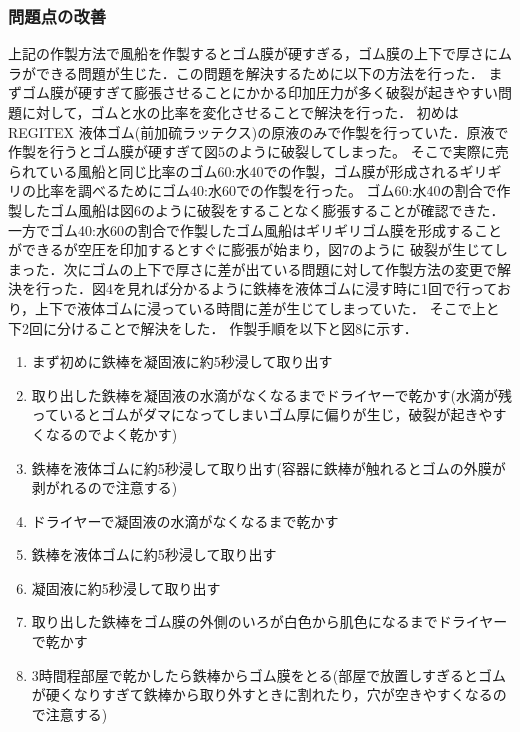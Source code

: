 \newpage
\subsubsection{問題点の改善}
上記の作製方法で風船を作製するとゴム膜が硬すぎる，ゴム膜の上下で厚さにムラができる問題が生じた．この問題を解決するために以下の方法を行った．
まずゴム膜が硬すぎて膨張させることにかかる印加圧力が多く破裂が起きやすい問題に対して，ゴムと水の比率を変化させることで解決を行った．
初めはREGITEX 液体ゴム(前加硫ラッテクス)の原液のみで作製を行っていた．原液で作製を行うとゴム膜が硬すぎて図5のように破裂してしまった。
そこで実際に売られている風船と同じ比率のゴム60:水40での作製，ゴム膜が形成されるギリギリの比率を調べるためにゴム40:水60での作製を行った。
ゴム60:水40の割合で作製したゴム風船は図6のように破裂をすることなく膨張することが確認できた．一方でゴム40:水60の割合で作製したゴム風船はギリギリゴム膜を形成することができるが空圧を印加するとすぐに膨張が始まり，図7のように
破裂が生じてしまった．次にゴムの上下で厚さに差が出ている問題に対して作製方法の変更で解決を行った．図4を見れば分かるように鉄棒を液体ゴムに浸す時に1回で行っており，上下で液体ゴムに浸っている時間に差が生じてしまっていた．
そこで上と下2回に分けることで解決をした．
作製手順を以下と図8に示す．
\begin{enumerate}
  \item まず初めに鉄棒を凝固液に約5秒浸して取り出す
  \item 取り出した鉄棒を凝固液の水滴がなくなるまでドライヤーで乾かす(水滴が残っているとゴムがダマになってしまいゴム厚に偏りが生じ，破裂が起きやすくなるのでよく乾かす)
  \item 鉄棒を液体ゴムに約5秒浸して取り出す(容器に鉄棒が触れるとゴムの外膜が剥がれるので注意する)
  \item ドライヤーで凝固液の水滴がなくなるまで乾かす
  \item 鉄棒を液体ゴムに約5秒浸して取り出す
  \item 凝固液に約5秒浸して取り出す
  \item 取り出した鉄棒をゴム膜の外側のいろが白色から肌色になるまでドライヤーで乾かす
  \item 3時間程部屋で乾かしたら鉄棒からゴム膜をとる(部屋で放置しすぎるとゴムが硬くなりすぎて鉄棒から取り外すときに割れたり，穴が空きやすくなるので注意する)
\end{enumerate}

